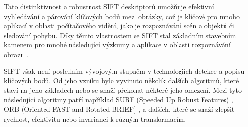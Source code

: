 Tato distinktivnost a robustnost SIFT deskriptorů umožňuje efektivní vyhledávání a párování klíčových bodů mezi obrázky, což je klíčové pro mnoho aplikací v oblasti počítačového vidění, jako je rozpoznávání scén a objektů či sledování pohybu. Díky těmto vlastnostem se SIFT stal základním stavebním kamenem pro mnohé následující výzkumy a aplikace v oblasti rozpoznávání obrazu \cite{sift}.

SIFT však není posledním vývojovým stupněm v technologiích detekce a popisu klíčových bodů. Od jeho vzniku bylo vyvinuto několik dalších algoritmů, které staví na jeho základech nebo se snaží překonat některé jeho omezení. Mezi tyto následující algoritmy patří například SURF (Speeded Up Robust Features) \cite{surf}, ORB (Oriented FAST and Rotated BRIEF) \cite{orb}, a dalších, které se snaží zlepšit rychlost, efektivitu nebo invarianci k různým transformacím.
\endinput